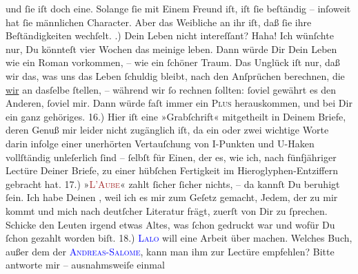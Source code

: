                und ſie iſt doch eine. Solange ſie mit Einem Freund iſt, iſt ſie beſtändig – inſoweit
               hat ſie männlichen Character. Aber das Weibliche an ihr iſt, daß ſie ihre
               Beſtändigkeiten wechſelt.\pend
           .) Dein Leben nicht intereſſant? Haha! Ich wünſchte nur, Du könnteſt vier Wochen
               das  meinige leben. {\pb}Dann würde  Dir Dein Leben wie ein Roman vorkommen, – wie ein ſchöner Traum. Das Unglück
               iſt nur, daß \strikeout{\textcolor{gray}{m}} wir das, was uns das Leben ſchuldig bleibt, nach den Anſprüchen berechnen, die
                  \uline{wir} an dasſelbe ſtellen, – während wir ſo rechnen
               ſollten: ſoviel gewährt es den Anderen, ſoviel mir. Dann würde faſt immer ein \textsc{Plus} herauskommen, und bei Dir ein ganz gehöriges.\pend
           \pstart
           {\pb}16.) Hier iſt eine »Grabſchrift« mitgetheilt in
               Deinem Briefe, deren Genuß mir leider nicht zugänglich iſt, da ein oder zwei wichtige
               Worte darin infolge einer unerhörten Vertauſchung von I-Punkten und U-Haken vollſtändig unleſerlich ſind – ſelbſt
               für Einen, der  es, wie ich, nach
               fünfjähriger Lectüre Deiner Briefe, zu einer hübſchen Fertigkeit im
               Hieroglyphen-Entziffern gebracht hat.\pend
           \pstart
           {\pb}17.) »\textsc{\textcolor{brown}{L’Aube}{}\ledrightnote{\textcolor{brown}{L’Aube}}}« zahlt ſicher ſicher nichts, – da kannſt Du beruhigt ſein. Ich habe Deinen
                  \label{K_L02774-34v}\label{K_L02774-34h}, weil ich es mir zum Geſetz \strikeout{\textcolor{gray}{ma}} gemacht, Jedem, der zu mir kommt und mich nach deutſcher Literatur frägt,
               zuerſt von Dir zu ſprechen. Schicke den Leuten irgend etwas Altes, was ſchon gedruckt
               war und wofür Du ſchon gezahlt worden biſt.\pend
           \pstart
           {\pb}18.) \textsc{\textcolor{blue}{Lalo}{}\ledrightnote{\textcolor{blue}{Pierre Lalo}}} will eine Arbeit über \label{K_L02774-35v}\label{K_L02774-35h} machen. Welches Buch, außer dem der \textsc{\textcolor{green}{\textcolor{blue}{Andreas-Salome}{}\ledrightnote{\textcolor{blue}{Lou Andreas-Salomé}}}{}}, kann man ihm zur Lectüre empfehlen? Bitte antworte mir – ausnahmsweiſe einmal
